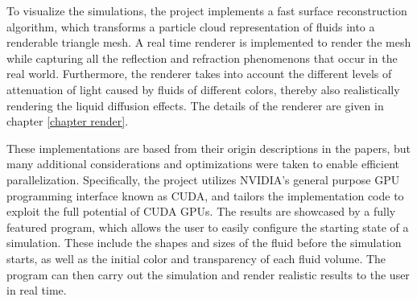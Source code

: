 To visualize the simulations, the project implements a fast surface reconstruction algorithm, which transforms a particle cloud representation of fluids into a renderable triangle mesh. A real time renderer is implemented to render the mesh while capturing all the reflection and refraction phenomenons that occur in the real world. Furthermore, the renderer takes into account the different levels of attenuation of light caused by fluids of different colors, thereby also realistically rendering the liquid diffusion effects. The details of the renderer are given in chapter \ref{chapter render}.

These implementations are based from their origin descriptions in the papers, but many additional considerations and optimizations were taken to enable efficient parallelization. Specifically, the project utilizes NVIDIA's general purpose GPU programming interface known as CUDA, and tailors the implementation code to exploit the full potential of CUDA GPUs. The results are showcased by a fully featured program, which allows the user to easily configure the starting state of a simulation. These include the shapes and sizes of the fluid before the simulation starts, as well as the initial color and transparency of each fluid volume. The program can then carry out the simulation and render realistic results to the user in real time.